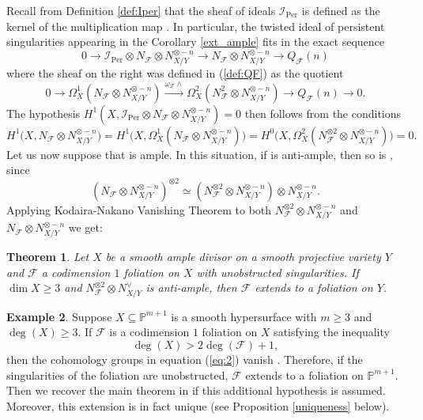 \documentclass[reqno]{amsart}
\theoremstyle{plain}
\renewcommand\P{\mathbb{P}}
\newcommand{\I}{\mathcal{I}}
\newcommand{\OO}{\mathcal{O}}
\renewcommand{\I}{\mathcal{I}}
\newcommand{\F}{\mathscr{F}}
\DeclareMathOperator{\Per}{Per}
\newcounter{Theorem}
\newtheorem{theorem}{Theorem}[section]
\theoremstyle{definition}
\newtheorem{example}[theorem]{Example}
\theoremstyle{named}
\begin{document}
Recall from Definition \ref{def:Iper} that the sheaf of ideals $\I_{\Per}$ is defined as the kernel of the multiplication map \smash{$d\omega_\F:\OO_X\rightarrow \Omega_X^2(N_\F)/(\omega_\F\wedge\Omega^1_X)$}. In particular, the twisted ideal of persistent singularities appearing in the Corollary \ref{ext_ample} fits in the exact sequence
\[
0\longrightarrow \I_{\Per}\otimes N_\F\otimes N_{X/Y}^{\otimes - n}\longrightarrow N_\F\otimes N_{X/Y}^{\otimes - n}\longrightarrow  Q_{\F}(n)
\]
where the sheaf on the right was defined in (\ref{def:QF}) as the quotient
\[
0\longrightarrow \Omega^1_X(N_\F\otimes N_{X/Y}^{\otimes - n})\xrightarrow{\omega_\F\wedge}\Omega^2_X(N_\F^2\otimes N_{X/Y}^{\otimes - n})\longrightarrow  Q_{\F}(n)\longrightarrow 0.
\]
The hypothesis $H^1(X,\I_{\Per}\otimes N_\F\otimes N_{X/Y}^{\otimes -n})=0$ then follows from the conditions
\begin{equation}\label{eq:2}
H^1\big(X,N_\F\otimes N_{X/Y}^{\otimes -n}\big) = H^1\big(X,\Omega^1_X(N_\F\otimes N_{X/Y}^{\otimes -n})\big) = H^0\big(X,\Omega^2_X(N_\F^{\otimes 2}\otimes N_{X/Y}^{\otimes -n})\big) = 0.   
\end{equation}
Let us now suppose that  is ample. In this situation, if \smash{$N_\F^{\otimes 2}\otimes N_{X/Y}^{\otimes -n}$} is anti-ample, then so is \smash{$N_\F\otimes N_{X/Y}^{\otimes -n}$}, since 
$$(N_\F\otimes N_{X/Y}^{\otimes -n})^{\otimes 2}\simeq (N_\F^{\otimes 2}\otimes N_{X/Y}^{\otimes -n})\otimes N_{X/Y}^{\otimes -n}.$$ Applying Kodaira-Nakano Vanishing Theorem to both $N_\F^{\otimes 2}\otimes N_{X/Y}^{\otimes -n}$ and $N_\F\otimes N_{X/Y}^{\otimes -n}$ we get:

\begin{theorem} \label{teo:positivity criterion}
Let $X$ be a smooth ample divisor on a smooth projective variety $Y$ and $\F$ a codimension $1$ foliation on $X$ with unobstructed singularities. If $\dim X\geqslant 3$ and $N_\F^{\otimes 2}\otimes N_{X/Y}^\vee$ is anti-ample, then $\F$ extends to a foliation on $Y$.
\end{theorem}

\begin{example} \label{ej:figueira}
Suppose $X\subseteq \P^{m+1}$ is a smooth hypersurface with $m\geqslant 3$ and $\deg(X)\geqslant 3$. If $\F$ is a codimension $1$ foliation on $X$ satisfying the inequality $$\deg(X)> 2\deg(\F)+1,$$ then the cohomology groups in equation (\ref{eq:2}) vanish \cite[Lemma 4.5]{araujo2013fano}. Therefore, if the singularities of the foliation are unobstructed, $\F$ extends to a foliation on $\P^{m+1}$. Then we recover the main theorem in \cite{figueira2023extensions} if this additional hypothesis is assumed. Moreover, this extension is in fact unique (see Proposition \ref{uniqueness} below).
\end{example}
\end{document}
